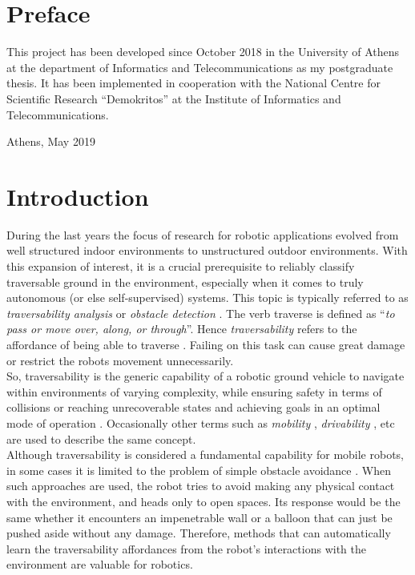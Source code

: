 \documentclass[12pt,a4paper,table,dvipsnames,tikz]{report}
\newcommand{\defn}[1]{\enquote{\textit{#1}}}
\newcommand{\term}{\textit}
\begin{document}
	
	{
		\hypersetup{linkcolor=black}
		\tableofcontents
		\listoftables
		\listoffigures
	}
	
	\chapter*{Preface}
	This project has been developed since October 2018 in the University of Athens at 
	the department of Informatics and Telecommunications as my postgraduate thesis. It 
	has been implemented in cooperation with the National Centre for Scientific Research 
	\enquote{Demokritos} at the Institute of Informatics and Telecommunications.\\
	\begin{flushright}
		Athens, May 2019
	\end{flushright}
	
	
	\chapter{Introduction}
	\label{sec:intro}
	
	During the last years the focus of research for robotic applications evolved 
	from well structured indoor environments to unstructured outdoor environments. 
	With this expansion of interest, it is a crucial prerequisite to reliably 
	classify traversable ground in the environment, especially when it comes to 
	truly autonomous (or else self-supervised) systems. This topic is typically referred to as 
	\term{traversability analysis} or \term{obstacle detection} \citep{Suger}. The 
	verb traverse is defined as \defn{to pass or move over, along, or through}. 
	Hence \term{traversability} refers to the affordance of being able to traverse 
	\citep{Ugur}. Failing on this task can cause great damage or restrict the robots 
	movement unnecessarily.
	\\
	
	So, traversability is the generic capability of a robotic ground 
	vehicle to navigate within environments of varying complexity, while ensuring 
	safety in terms of collisions or reaching unrecoverable states and achieving 
	goals in an optimal mode of operation \citep{Papadakis}. Occasionally other 
	terms such as \term{mobility} \citep{Lalonde}, \term{drivability} \citep{Droeschel}, 
	etc are used to describe the same concept.
	\\
	
	Although traversability is considered a fundamental capability for mobile 
	robots, in some cases it is limited to the problem of simple obstacle avoidance 
	\citep{Ugur}. When such approaches are used, the robot tries to avoid making any 
	physical contact with the environment, and heads only to open spaces. Its 
	response would be the same whether it encounters an impenetrable wall or a 
	balloon that can just be pushed aside without any damage. Therefore, methods 
	that can automatically learn the traversability affordances from the 
	robot’s interactions with the environment are valuable for robotics.
	\\
		
\end{document}
